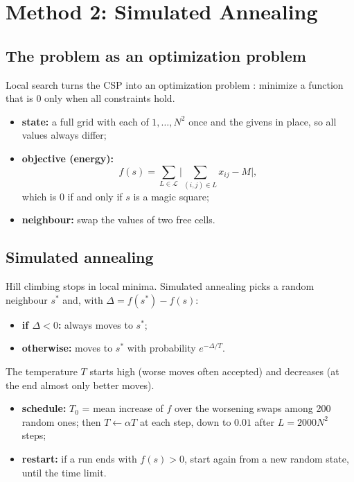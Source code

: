 \documentclass[11pt,a4paper]{article}
\begin{document}
\section{Method 2: Simulated Annealing}
\label{sec:m2}

\subsection{The problem as an optimization problem}

Local search turns the CSP into an optimization problem \cite{slides}:
minimize a function that is $0$ only when all constraints hold.
\begin{itemize}[nosep]
  \item \textbf{state:} a full grid with each of $1,\dots,N^2$ once and the
        givens in place, so all values always differ;
  \item \textbf{objective (energy):}
        \[
        f(s)=\sum_{L\in\mathcal{L}}\Big|\sum_{(i,j)\in L}x_{ij}-M\Big|,
        \]
        which is $0$ if and only if $s$ is a magic square;
  \item \textbf{neighbour:} swap the values of two free cells.
\end{itemize}

\subsection{Simulated annealing}

Hill climbing stops in local minima. Simulated annealing picks a random
neighbour $s^*$ and, with $\Delta=f(s^*)-f(s)$:
\begin{itemize}[nosep]
  \item \textbf{if $\Delta<0$:} always moves to $s^*$;
  \item \textbf{otherwise:} moves to $s^*$ with probability $e^{-\Delta/T}$.
\end{itemize}
The temperature $T$ starts high (worse moves often accepted) and
decreases (at the end almost only better moves).
\begin{itemize}[nosep]
  \item \textbf{schedule:} $T_0$ = mean increase of $f$ over the worsening
        swaps among 200 random ones; then $T\gets\alpha T$ at each step,
        down to $0.01$ after $L=2000N^2$ steps;
  \item \textbf{restart:} if a run ends with $f(s)>0$, start again from a
        new random state, until the time limit.
\end{itemize}
\end{document}
